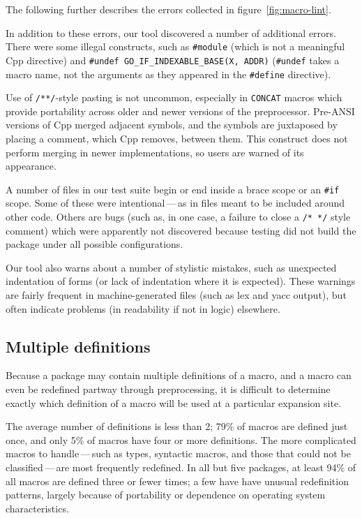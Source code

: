 \documentclass[10pt]{article}
\begin{document}

The following further describes the errors collected in
figure~\ref{fig:macro-lint}.

{}

In addition to these errors, our tool discovered a number of additional
errors.  There were some illegal constructs, such as {\tt \#module} (which
is not a meaningful Cpp directive) and {\tt \#undef
\verb|GO_IF_INDEXABLE_BASE|(X, ADDR)} ({\tt \#undef} takes a macro name,
not the arguments as they appeared in the {\tt \#define} directive).
  
Use of {\tt /**/}-style pasting is not uncommon, especially in {\tt CONCAT}
macros which provide portability across older and newer versions of the
preprocessor.  Pre-ANSI versions of Cpp merged adjacent symbols, and the
symbols are juxtaposed by placing a comment, which Cpp removes, between
them.  This construct does not perform merging in newer implementations,
so users are warned of its appearance.

A number of files in our test suite begin or end inside a brace scope or an
{\tt \#if} scope.  Some of these were intentional\,---\,as in files meant
to be included around other code.  Others are bugs (such as, in one case, a
failure to close a {\tt /* */} style comment) which were apparently not
discovered because testing did not build the package under all possible
configurations.

Our tool also warns about a number of stylistic mistakes, such as
unexpected indentation of forms (or lack of indentation where it is
expected).  These warnings are fairly frequent in machine-generated files
(such as lex and yacc output), but often indicate problems (in readability
if not in logic) elsewhere.


\subsection{Multiple definitions}
\label{sec:mult-def}

Because a package may contain multiple definitions of a macro, and a macro
can even be redefined partway through preprocessing, it is difficult to
determine exactly which definition of a macro will be used at a particular
expansion site.

The average number of definitions is less than 2; 79\% of macros are
defined just once, and only 5\% of macros have four or more definitions.
The more complicated macros to handle\,---\,such as types, syntactic
macros, and those that could not be classified\,---\,are most frequently
redefined.  In all but five packages, at least 94\% of all macros are defined
three or fewer times; a few have have unusual redefinition patterns,
largely because of portability or dependence on operating system
characteristics.
\end{document}
